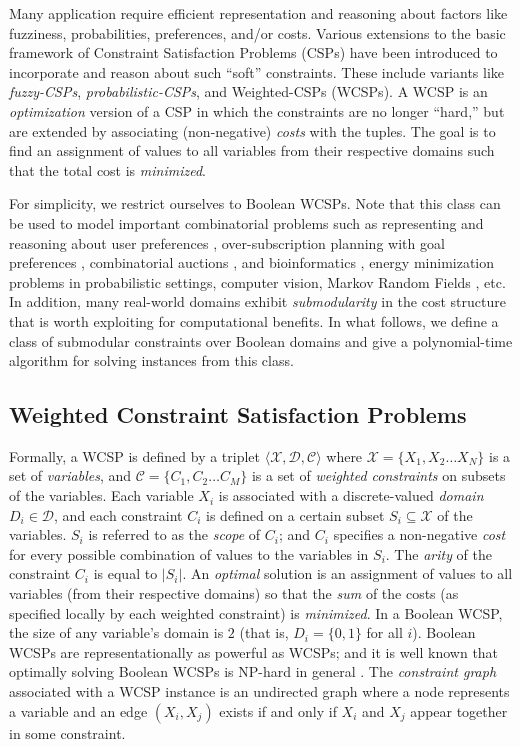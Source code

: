 

  Many application require efficient representation and reasoning about factors like fuzziness, probabilities, preferences, and/or costs. Various extensions to the basic framework of Constraint Satisfaction Problems (CSPs) \cite{D:BOOK:03} have been introduced to incorporate and reason about such ``soft'' constraints. These include variants like \emph{fuzzy-CSPs}, \emph{probabilistic-CSPs}, and Weighted-CSPs (WCSPs). A WCSP is an \emph{optimization} version of a CSP in which the constraints are no longer ``hard,'' but are extended by associating (non-negative) \emph{costs} with the tuples. The goal is to find an assignment of values to all variables from their respective domains such that the total cost is \emph{minimized}.
  
  For simplicity, we restrict ourselves to Boolean WCSPs. Note that this class can be used to model important combinatorial problems such as representing and reasoning about user preferences \cite{BBDHP:JAIR:04}, over-subscription planning with goal preferences \cite{D:IJCAI:07}, combinatorial auctions \cite{S:AI:02}, and bioinformatics \cite{SGSST:AI:07}, energy minimization problems in probabilistic settings, computer vision, Markov Random Fields \cite{K:MSR:05}, etc. In addition, many real-world domains exhibit \emph{submodularity} in the cost structure that is worth exploiting for computational benefits. In what follows, we define a class of submodular constraints over Boolean domains and give a polynomial-time algorithm for solving instances from this class. 
  
\subsection{Weighted Constraint Satisfaction Problems}
  Formally, a WCSP is defined by a triplet $\langle \mathcal{X,D,C} \rangle$ where $\mathcal{X} = \{ X_1,X_2 \ldots X_N \}$ is a set of \emph{variables}, and $\mathcal{C} = \{ C_1,C_2 \ldots C_M \}$ is a set of \emph{weighted constraints} on subsets of the variables. Each variable $X_i$ is associated with a discrete-valued \emph{domain} $D_i \in \mathcal{D}$, and each constraint $C_i$ is defined on a certain subset $S_i \subseteq \mathcal{X}$ of the variables. $S_i$ is referred to as the \emph{scope} of $C_i$; and $C_i$ specifies a non-negative \emph{cost} for every possible combination of values to the variables in $S_i$. The \emph{arity} of the constraint $C_i$ is equal to $|S_i|$. An \emph{optimal} solution is an assignment of values to all variables (from their respective domains) so that the \emph{sum} of the costs (as specified locally by each weighted constraint) is \emph{minimized}. In a Boolean WCSP, the size of any variable's domain is $2$ (that is, $D_i = \{ 0,1 \}$ for all $i$). Boolean WCSPs are representationally as powerful as WCSPs; and it is well known that optimally solving Boolean WCSPs is NP-hard in general \cite{D:BOOK:03}. The \emph{constraint graph} associated with a WCSP instance is an undirected graph where a node represents a variable and an edge $(X_i,X_j)$ exists if and only if $X_i$ and $X_j$ appear together in some constraint.


